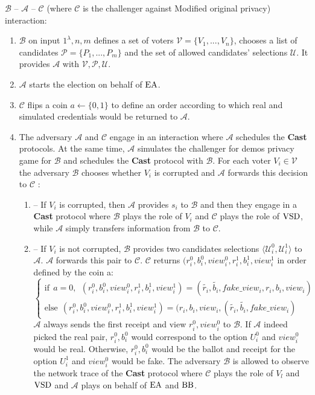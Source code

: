 $\mathcal{B}$ -- $\mathcal{A}$ -- $\mathcal{C}$ (where  $\mathcal{C}$ is the challenger against Modified original privacy) interaction: 
\begin{enumerate}
\item $\mathcal{B}$ on input $1^{\lambda},n,m$ defines a set of voters  $\mathcal{V} = \{V_1,...,V_n\}$, chooses a list of candidates  $\mathcal{P} = \{P_1,...,P_m\}$ and the set of allowed candidates' selections $\mathcal{U}$.  It provides $\mathcal{A}$ with $\mathcal{V}, \mathcal{P}, \mathcal{U}$.
 \item $\mathcal{A}$ starts the election on behalf of $\operatorname{EA}$.
 \item $\mathcal{C}$ flips a coin $a \leftarrow \{0,1\}$ to define an order according to which real and simulated credentials would be returned to $\mathcal{A}$. 
 \item The adversary $\mathcal{A}$  and $\mathcal{C}$ engage in an interaction where $\mathcal{A}$ schedules the \textbf{Cast} protocols. At the same time, $\mathcal{A}$ simulates the challenger for demos privacy game for $\mathcal{B}$ and schedules the  \textbf{Cast}  protocol with $\mathcal{B}$. For each voter  $V_i \in \mathcal{V}$ the adversary $\mathcal{B}$  chooses whether $V_i$ is corrupted and $\mathcal{A}$ forwards this decision to $\mathcal{C}$ :
 \begin{enumerate}
\item[] -- If $V_i$ is corrupted, then $\mathcal{A}$ provides $s_i$ to $\mathcal{B}$ and then they engage in a \textbf{Cast} protocol where  $\mathcal{B}$ plays the role of $V_i$ and  $\mathcal{C}$ plays the role of $\operatorname{VSD}$, while $\mathcal{A}$ simply transfers information from $\mathcal{B}$ to $\mathcal{C}$.
\item[] --  If $V_i$ is not corrupted, $\mathcal{B}$ provides two candidates selections $\langle \mathcal{U}^0_i , \mathcal{U}^1_i \rangle$ to $\mathcal{A}$. $\mathcal{A}$ forwards this pair to $\mathcal{C}$.  $\mathcal{C}$ returns $(r_i^0,b_i^0,view_i^0,r_i^1,b_i^1,view_i^1$ in order defined by the coin a:\\
$ \begin{cases}
 \text{if} ~~a =0,~~ (r_i^0,b_i^0,view_i^0,r_i^1,b_i^1,view_i^1) = (\tilde{r_i},\tilde{b_i},fake\_view_i,r_i,b_i,view_i)  \\ 
 \text{else}~~  (r_i^0,b_i^0,view_i^0,r_i^1,b_i^1,view_i^1) = (r_i,b_i,view_i,(\tilde{r_i},\tilde{b_i},fake\_view_i)
\end{cases}$\\
$\mathcal{A}$ always sends the first receipt and view $r^0_i,view_i^0$ to  $\mathcal{B}$.  If  $\mathcal{A}$ indeed picked the real pair, $r_i^0,b_i^0$ would correspond to the option  $U^0_i$  and $view_i^0$ would be real. Otherwise, $r_i^0,b_i^0$ would be the ballot and receipt for the option  $U^1_i$ and $view_i^0$ would be fake. The adversary  $\mathcal{B}$ is allowed to observe the network trace of the \textbf{Cast} protocol where $\mathcal{C}$ plays the role of $V_l$ and $\operatorname{VSD}$ and  $\mathcal{A}$ plays on behalf of $\operatorname{EA}$ and $\operatorname{BB}$. 

\end{enumerate}
\end{enumerate}
